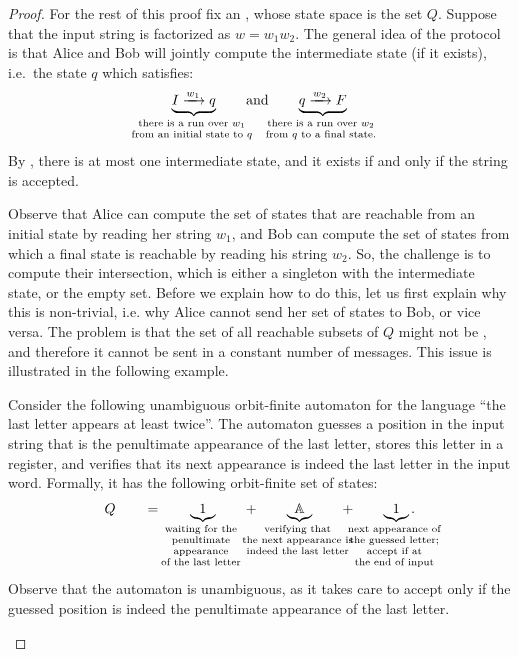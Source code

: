 \begin{proof}
  For the rest of this proof fix an , whose state space is the  set $Q$.
Suppose that the input string is factorized as $w = w_1 w_2$. The general idea of the protocol is that Alice and Bob will jointly
compute the intermediate state (if it exists), i.e.~the state $q$ which satisfies:
\begin{align*}
\myunderbrace{I \xrightarrow{w_1}q}{there is a run over $w_1$\\ from an initial state to $q$} \qquad \text{and} \qquad
\myunderbrace{q \xrightarrow{w_2} F}{there is a run over $w_2$\\ from $q$ to a final state.}
\end{align*}
By , there is at most one intermediate state, and it exists if and only if the string is accepted.

Observe that Alice can compute the set of states that are reachable from an
initial state by reading her string $w_1$, and Bob can compute the set of
states from which a final state is reachable by reading his string $w_2$. So,
the challenge is to compute their intersection, which is either a singleton
with the intermediate state, or the empty set. Before we explain how to do
this, let us first explain why this is non-trivial, i.e. why Alice cannot send
her set of states to Bob, or vice versa. The problem is that the set of all
reachable subsets of $Q$ might not be , and therefore it cannot be sent
in a constant number of messages. This issue is illustrated in the following
example.

\begin{myexample}
Consider the following unambiguous orbit-finite automaton for  the language ``the last letter appears at least twice''. The automaton guesses a position in the input string that is the penultimate appearance of the last letter, stores this letter in a register,
and verifies that its next appearance is indeed the last letter in the input word.
Formally, it has the following orbit-finite set of states:  
\begin{align*}
  Q \qquad = \qquad  \myunderbrace{1}{waiting for the\\ penultimate \\ appearance\\ of the last letter} \qquad +
      \qquad \myunderbrace{\atoms}{verifying that\\ the next appearance is\\ indeed the last letter}  \qquad + \qquad
      \myunderbrace{1}{next appearance of \\ the guessed letter; \\ accept if at \\ the end of input}.
\end{align*}
Observe that the automaton is unambiguous, as it takes care to accept only if the guessed position is indeed the penultimate appearance of the last letter.


\end{myexample}
\end{proof}
